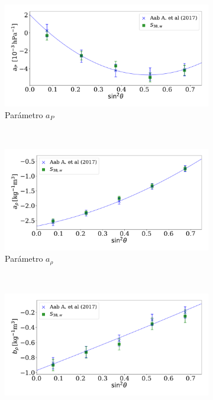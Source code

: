        \begin{figure}[H]
        \centering
           \begin{subfigure}[b]{0.75\textwidth}
           \includegraphics[width=\linewidth]{Graphs/params/ap_ICRC_2019_S38_above_0EeV.pdf}
           \caption{Parámetro $a_P$ }
           \label{fig:ap_2019_S38}
           \end{subfigure}\\%
           \begin{subfigure}[b]{0.75\textwidth}
           \includegraphics[width=\linewidth]{Graphs/params/arho_ICRC_2019_S38_above_0EeV.pdf}
           \caption{Parámetro $a_{\rho}$ }
           \label{fig:arho_2019_S38}
           \end{subfigure}\\%
           \begin{subfigure}[b]{\textwidth}
           \centering
           \includegraphics[width=0.75\linewidth]{Graphs/params/brho_ICRC_2019_S38_above_0EeV.pdf}

\end{subfigure}
\end{figure}
